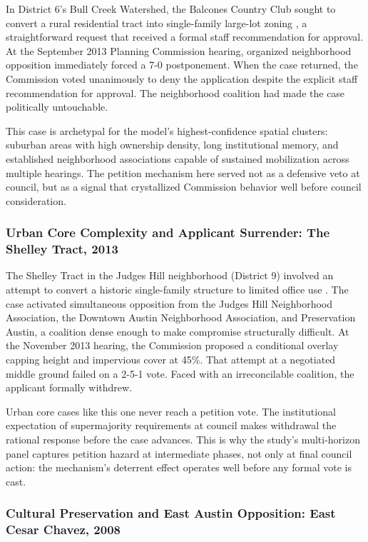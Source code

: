 In District 6's Bull Creek Watershed, the Balcones Country Club sought to convert a rural residential tract into single-family large-lot zoning \cite{case_c14_2013_0098}, a straightforward request that received a formal staff recommendation for approval. At the September 2013 Planning Commission hearing, organized neighborhood opposition immediately forced a 7-0 postponement. When the case returned, the Commission voted unanimously to deny the application despite the explicit staff recommendation for approval. The neighborhood coalition had made the case politically untouchable.

This case is archetypal for the model's highest-confidence spatial clusters: suburban areas with high ownership density, long institutional memory, and established neighborhood associations capable of sustained mobilization across multiple hearings. The petition mechanism here served not as a defensive veto at council, but as a signal that crystallized Commission behavior well before council consideration.

\subsubsection{Urban Core Complexity and Applicant Surrender: The Shelley Tract, 2013}

The Shelley Tract in the Judges Hill neighborhood (District 9) involved an attempt to convert a historic single-family structure to limited office use \cite{case_c14_2013_0104}. The case activated simultaneous opposition from the Judges Hill Neighborhood Association, the Downtown Austin Neighborhood Association, and Preservation Austin, a coalition dense enough to make compromise structurally difficult. At the November 2013 hearing, the Commission proposed a conditional overlay capping height and impervious cover at 45\%. That attempt at a negotiated middle ground failed on a 2-5-1 vote. Faced with an irreconcilable coalition, the applicant formally withdrew.

Urban core cases like this one never reach a petition vote. The institutional expectation of supermajority requirements at council makes withdrawal the rational response before the case advances. This is why the study's multi-horizon panel captures petition hazard at intermediate phases, not only at final council action: the mechanism's deterrent effect operates well before any formal vote is cast.

\subsubsection{Cultural Preservation and East Austin Opposition: East Cesar Chavez, 2008}

